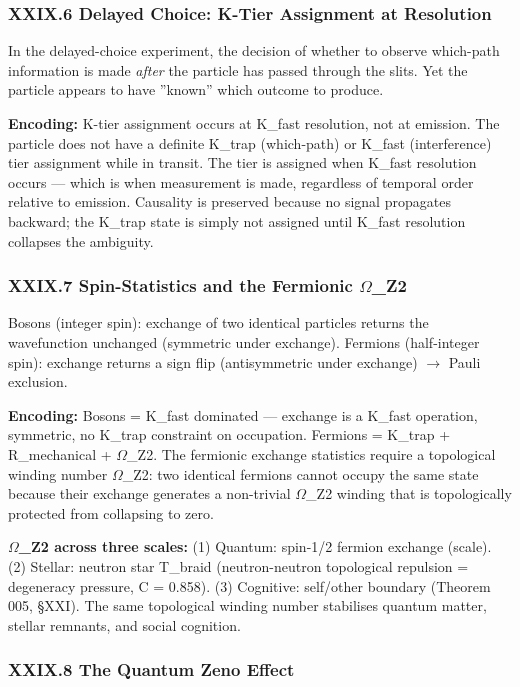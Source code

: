 \documentclass[12pt,a4paper]{article}
\begin{document}
\subsubsection{XXIX.6 Delayed Choice: K-Tier Assignment at Resolution}

In the delayed-choice experiment, the decision of whether to observe which-path information is made \emph{after} the particle has passed through the slits. Yet the particle appears to have ''known'' which outcome to produce.

\textbf{Encoding:} K-tier assignment occurs at K\_fast resolution, not at emission. The particle does not have a definite K\_trap (which-path) or K\_fast (interference) tier assignment while in transit. The tier is assigned when K\_fast resolution occurs --- which is when measurement is made, regardless of temporal order relative to emission. Causality is preserved because no signal propagates backward; the K\_trap state is simply not assigned until K\_fast resolution collapses the ambiguity.

\subsubsection{XXIX.7 Spin-Statistics and the Fermionic $\Omega$\_Z2}

Bosons (integer spin): exchange of two identical particles returns the wavefunction unchanged (symmetric under exchange). Fermions (half-integer spin): exchange returns a sign flip (antisymmetric under exchange) $\rightarrow$ Pauli exclusion.

\textbf{Encoding:} Bosons = K\_fast dominated --- exchange is a K\_fast operation, symmetric, no K\_trap constraint on occupation. Fermions = K\_trap + R\_mechanical + $\Omega$\_Z2. The fermionic exchange statistics require a topological winding number $\Omega$\_Z2: two identical fermions cannot occupy the same state because their exchange generates a non-trivial $\Omega$\_Z2 winding that is topologically protected from collapsing to zero.

\textbf{$\Omega$\_Z2 across three scales:} (1) Quantum: spin-1/2 fermion exchange (\hbar scale). (2) Stellar: neutron star T\_braid (neutron-neutron topological repulsion = degeneracy pressure, C = 0.858). (3) Cognitive: self/other boundary (Theorem 005, §XXI). The same topological winding number stabilises quantum matter, stellar remnants, and social cognition.

\subsubsection{XXIX.8 The Quantum Zeno Effect}
\end{document}
